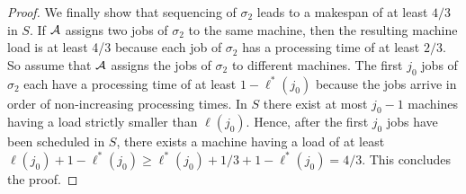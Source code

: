 \documentclass{llncs}
\begin{document}
\begin{proof}
We finally show that sequencing of $\sigma_2$ leads to a makespan of at least $4/3$ in $S$. If
${\cal A}$ assigns two jobs of $\sigma_2$ to the same machine, then the resulting machine load is
at least 4/3 because each job of $\sigma_2$ has a processing time of at least $2/3$. So assume that
${\cal A}$ assigns the jobs of $\sigma_2$ to different machines. The first $j_0$ jobs of $\sigma_2$ each
have a processing time of at least $1-\ell^*(j_0)$ because the jobs arrive in order of non-increasing
processing times. In $S$ there exist at most $j_0-1$ machines having a load strictly smaller than
$\ell(j_0)$. Hence, after the first $j_0$ jobs have been scheduled in $S$, there exists a machine
having a load of at least $\ell(j_0) +1 - \ell^*(j_0) \geq \ell^*(j_0) +1/3+1 - \ell^*(j_0) = 4/3$.
This concludes the proof. \hspace*{\fill}{$\Box$}
\end{proof}
\end{document}

